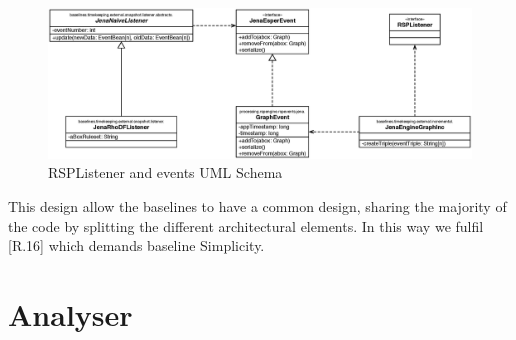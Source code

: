 \begin{figure}[tbh]
  \centering
	\includegraphics[width=\linewidth]{images/uml_baselines_rel_listener_event}
	\caption{RSPListener and events UML Schema} 
  	\label{fig:uml_baselines_rel_listener_event}
\end{figure}

This design allow the baselines to have a common design, sharing the majority of the code by splitting the different architectural elements. In this way we fulfil [R.16] which demands baseline Simplicity.


\section{Analyser}\label{sec:analyser-impl}




